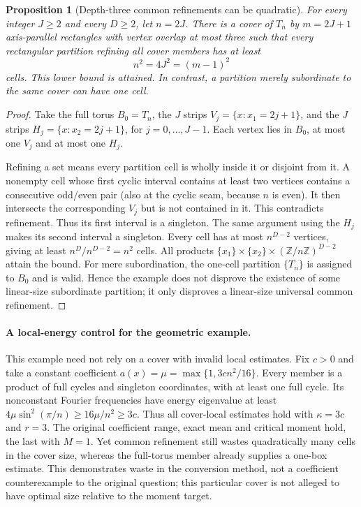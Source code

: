 \documentclass[11pt]{article}
\newtheorem{proposition}{Proposition}
\begin{document}
\begin{proposition}[Depth-three common refinements can be quadratic]
For every integer $J\ge2$ and every $D\ge2$, let $n=2J$. There is a cover
of $T_n$ by $m=2J+1$ axis-parallel rectangles with vertex overlap at most
three such that every rectangular partition refining \emph{all} cover
members has at least
\[
 n^2=4J^2=(m-1)^2
\]
cells. This lower bound is attained. In contrast, a partition merely
subordinate to the same cover can have one cell.
\end{proposition}
\begin{proof}
Take the full torus $B_0=T_n$, the $J$ strips
$V_j=\{x:x_1=2j+1\}$, and the $J$ strips
$H_j=\{x:x_2=2j+1\}$, for $j=0,\ldots,J-1$.
Each vertex lies in $B_0$, at most one $V_j$ and at most one $H_j$.

Refining a set means every partition cell is wholly inside it or disjoint
from it. A nonempty cell whose first cyclic interval contains at least two
vertices contains a consecutive odd/even pair (also at the cyclic seam,
because $n$ is even). It then intersects the corresponding $V_j$ but is
not contained in it. This contradicts refinement. Thus its first interval
is a singleton. The same argument using the $H_j$ makes its second interval
a singleton. Every cell has at most $n^{D-2}$ vertices, giving at least
$n^D/n^{D-2}=n^2$ cells. All products
$\{x_1\}\times\{x_2\}\times(\mathbb Z/n\mathbb Z)^{D-2}$ attain the bound.
For mere subordination, the one-cell partition $\{T_n\}$ is assigned to
$B_0$ and is valid. Hence the example does not disprove the existence of
some linear-size subordinate partition; it only disproves a linear-size
universal common refinement.
\end{proof}

\paragraph{A local-energy control for the geometric example.}
This example need not rely on a cover with invalid local estimates. Fix
$c>0$ and take a constant coefficient
$a(x)=\mu=\max\{1,3cn^2/16\}$. Every member is a product of full cycles
and singleton coordinates, with at least one full cycle. Its nonconstant
Fourier frequencies have energy eigenvalue at least
$4\mu\sin^2(\pi/n)\ge16\mu/n^2\ge3c$.
Thus all cover-local estimates hold with $\kappa=3c$ and $r=3$.
The original coefficient range, exact mean and critical moment hold, the
last with $M=1$. Yet common refinement still wastes quadratically many
cells in the cover size, whereas the full-torus member already supplies a
one-box estimate. This demonstrates waste in the conversion method, not a
coefficient counterexample to the original question; this particular cover
is not alleged to have optimal size relative to the moment target.
\end{document}
